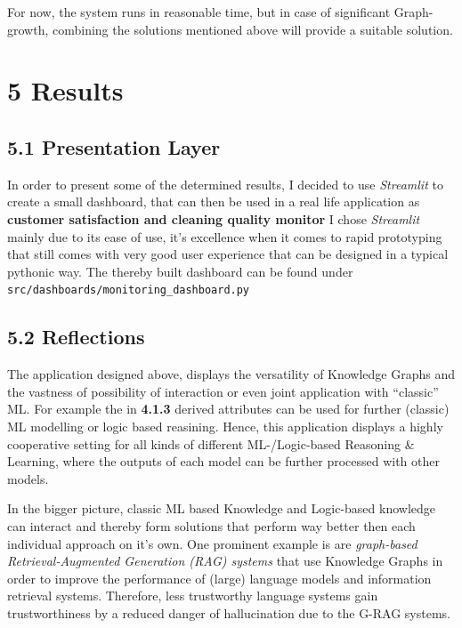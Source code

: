 \documentclass[
]{article}
\begin{document}
For now, the system runs in reasonable time, but in case of significant
Graph-growth, combining the solutions mentioned above will provide a
suitable solution.

\section{5 Results}\label{results-1}

\subsection{5.1 Presentation Layer}\label{presentation-layer}

In order to present some of the determined results, I decided to use
\emph{Streamlit} to create a small dashboard, that can then be used in a
real life application as \textbf{customer satisfaction and cleaning
quality monitor} I chose \emph{Streamlit} mainly due to its ease of use,
it's excellence when it comes to rapid prototyping that still comes with
very good user experience that can be designed in a typical pythonic
way. The thereby built dashboard can be found under
\texttt{src/dashboards/monitoring\_dashboard.py}

\subsection{5.2 Reflections}\label{reflections}

The application designed above, displays the versatility of Knowledge
Graphs and the vastness of possibility of interaction or even joint
application with ``classic'' ML. For example the in \textbf{4.1.3}
derived attributes can be used for further (classic) ML modelling or
logic based reasining. Hence, this application displays a highly
cooperative setting for all kinds of different ML-/Logic-based Reasoning
\& Learning, where the outputs of each model can be further processed
with other models.



In the bigger picture, classic ML based Knowledge and Logic-based
knowledge can interact and thereby form solutions that perform way
better then each individual approach on it's own. One prominent example
is are \emph{graph-based Retrieval-Augmented Generation (RAG) systems}
that use Knowledge Graphs in order to improve the performance of (large)
language models and information retrieval systems. Therefore, less
trustworthy language systems gain trustworthiness by a reduced danger of
hallucination due to the G-RAG systems.
\end{document}
